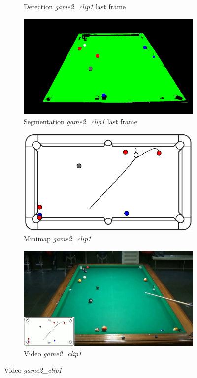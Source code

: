 \begin{figure}[H]
\begin{subfigure}[b]{0.48\textwidth}
		\caption{Detection \textit{game2\_clip1} last frame}
		\label{fig: game2_clip1_last_frame_detected}
	\end{subfigure}
	\begin{subfigure}[b]{0.48\textwidth}
		\centering
		\includegraphics[width=\textwidth]{images/Segmentation/game2_clip1_segmented_balls_last_frame.jpg}
		\caption{Segmentation \textit{game2\_clip1} last frame}
		\label{fig: game2_clip1_last_frame_segmented}
	\end{subfigure}
	\begin{subfigure}[b]{0.48\textwidth}
		\centering
		\includegraphics[width=\textwidth]{images/AllMinimap/game2_clip1_minimap.png}
		\caption{Minimap \textit{game2\_clip1}}
		\label{fig: game2_clip1_minimap}
	\end{subfigure}
	\begin{subfigure}[b]{0.48\textwidth}
		\centering
		\includegraphics[width=\textwidth]{images/Video/game2_clip1_video.jpg}
		\caption{Video \textit{game2\_clip1}}
		\label{fig: game2_clip1_video}
	\end{subfigure}


\end{figure}
